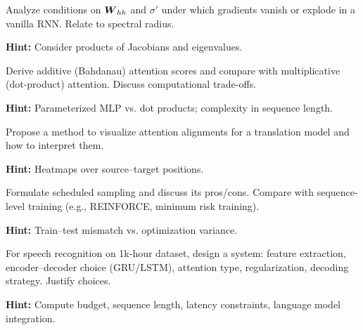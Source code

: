 \begin{problem}
Analyze conditions on $\boldsymbol{W}_{hh}$ and $\sigma'$ under which gradients vanish or explode in a vanilla RNN. Relate to spectral radius.

\textbf{Hint:} Consider products of Jacobians and eigenvalues.
\end{problem}

\begin{problem}
Derive additive (Bahdanau) attention scores and compare with multiplicative (dot-product) attention. Discuss computational trade-offs.

\textbf{Hint:} Parameterized MLP vs. dot products; complexity in sequence length.
\end{problem}

\begin{problem}
Propose a method to visualize attention alignments for a translation model and how to interpret them.

\textbf{Hint:} Heatmaps over source–target positions.
\end{problem}

\begin{problem}
Formulate scheduled sampling and discuss its pros/cons. Compare with sequence-level training (e.g., REINFORCE, minimum risk training).

\textbf{Hint:} Train–test mismatch vs. optimization variance.
\end{problem}

\begin{problem}
For speech recognition on 1k-hour dataset, design a system: feature extraction, encoder–decoder choice (GRU/LSTM), attention type, regularization, decoding strategy. Justify choices.

\textbf{Hint:} Compute budget, sequence length, latency constraints, language model integration.
\end{problem}



